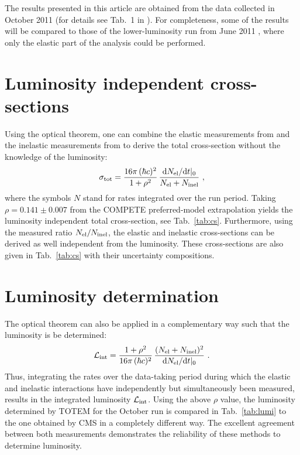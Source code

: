 \documentclass[doublecol]{epl/epl2}
\def\d{{\rm d}}
\begin{document}
The results presented in this article are obtained from the data collected in October 2011 (for details see Tab.~1 in \cite{P1}).
For completeness, some of the results will be compared to those of the lower-luminosity run from June 2011 \cite{epl96}, where only the elastic part of the analysis could be performed.


\section{Luminosity independent cross-sections}

Using the optical theorem, one can combine the elastic measurements from \cite{P1} and the inelastic measurements from \cite{P2} to derive the total cross-section without the knowledge of the luminosity:
\begin{equation}
\label{eq:m lumi indep}
	\sigma_{\rm tot} = {16\pi\, (\hbar c)^2\over 1 + \rho^2}\, {\d N_{\rm el}/\d t|_0 \over N_{\rm el} + N_{\rm inel} }\ ,
\end{equation}
where the symbols $N$ stand for rates integrated over the run period. Taking $\rho = 0.141\pm 0.007$ from the COMPETE \cite{compete} preferred-model extrapolation yields the luminosity independent total cross-section, see Tab.~\ref{tab:cs}. Furthermore, using the measured ratio $N_{\rm el} / N_{\rm inel}$, the elastic and inelastic cross-sections can be derived as well independent from the luminosity. These cross-sections are also given in Tab.~\ref{tab:cs} with their uncertainty compositions.

\TabCS
\TabLumi
\FigSigmas

\section{Luminosity determination}

The optical theorem can also be applied in a complementary way such that the luminosity is be determined:
\begin{equation}
\label{eq:lumi oct}
{\cal L_{\rm int}} = {1 + \rho^2 \over 16\pi\, (\hbar c)^2}\, { (N_{\rm el} + N_{\rm inel})^2 \over \d N_{\rm el}/\d t|_0 }\ .
\end{equation}
Thus, integrating the rates over the data-taking period during which the elastic \cite{P1} and inelastic \cite{P2} interactions have independently but simultaneously been measured, results in the integrated luminosity ${\cal L}_{\rm int}$. Using the above $\rho$ value, the luminosity determined by TOTEM for the October run is compared in Tab.~\ref{tab:lumi} to the one obtained by CMS in a completely different way. The excellent agreement between both measurements demonstrates the reliability of these methods to determine luminosity.
\end{document}
